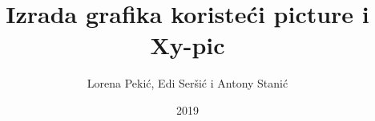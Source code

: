 \documentclass[17p]{beamer}
\title{Izrada grafika koristeći picture i Xy-pic}
\author{Lorena Pekić, Edi Seršić i Antony Stanić}
\date{2019}
\begin{document}
\frame{\titlepage}


%



%

\nocite{IZVOR:1,IZVOR:2,IZVOR:3,IZVOR:4,IZVOR:5,IZVOR:6,IZVOR:7}
\end{document}
